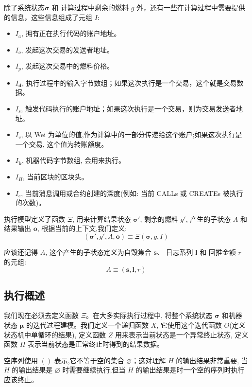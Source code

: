\documentclass[9pt,oneside]{amsart}
\begin{document}
\begin{multicols}{2}
除了系统状态$\boldsymbol{\sigma}$ 和 计算过程中剩余的燃料 $g$ 外，还有一些在计算过程中需要提供的信息，这些信息组成了元组 $I$:
\begin{itemize}
\item $I_a$, 拥有正在执行代码的账户地址。
\item $I_o$, 发起这次交易的发送者地址。
\item $I_p$, 发起这次交易中的燃料价格。
\item $I_\mathbf{d}$, 执行过程中的输入字节数组；如果这次执行是一个交易，这个就是交易数据。
\item $I_s$, 触发代码执行的账户地址；如果这次执行是一个交易，则为交易发送者地址。
\item $I_v$, 以 Wei 为单位的值,作为计算中的一部分传递给这个账户;如果这次执行是一个交易, 这个值为转账额度。
\item $I_\mathbf{b}$, 机器代码字节数组, 会用来执行。
\item $I_H$, 当前区块的区块头。
\item $I_e$, 当前消息调用或合约创建的深度(例如: 当前 {\small CALL}s 或 {\small CREATE}s 被执行的次数)。
\end{itemize}

执行模型定义了函数 $\Xi$, 用来计算结果状态 $\boldsymbol{\sigma}'$, 剩余的燃料 $g'$, 产生的子状态 $A$ 和结果输出 $\mathbf{o}$, 根据当前的上下文,我们定义:
\begin{equation}
(\boldsymbol{\sigma}', g', A, \mathbf{o}) \equiv \Xi(\boldsymbol{\sigma}, g, I)
\end{equation}

应该还记得 $A$, 这个产生的子状态定义为自毁集合 $\mathbf{s}$、 日志系列 $\mathbf{l}$ 和 回推金额 $r$ 的元组:
\begin{equation}
A \equiv (\mathbf{s}, \mathbf{l}, r)
\end{equation}

\subsection{执行概述}

我们现在必须去定义函数 $\Xi$。在大多实际执行过程中, 将整个系统状态 $\boldsymbol{\sigma}$ 和机器状态 $\boldsymbol{\mu}$ 的迭代过程建模。我们定义一个递归函数 $X$, 它使用这个迭代函数 $O$(定义状态机中单循环的结果), 定义函数 $Z$ 用来表示当前状态是一个异常终止状态, 定义函数 $H$ 表示当前状态是正常终止时得到的结果数据。

空序列使用 $()$ 表示,它不等于空的集合 $\varnothing$；这对理解 $H$ 的输出结果非常重要, 当 $H$ 的输出结果是 $\varnothing$ 时需要继续执行,但当 $H$ 的输出结果是时一个空的序列时执行应该终止。


\end{multicols}
\end{document}
